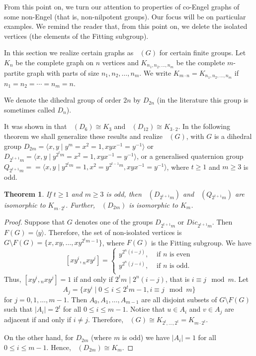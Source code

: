 \documentclass[reqno,12pt]{amsart}
\theoremstyle{plain}
\newtheorem{thm}{Theorem}[section]
\theoremstyle{definition}
\newcommand{\coeng}{\mathop{\mathcal{E}_c^-}}
\begin{document}
From this point on, we turn our attention to properties of co-Engel graphs of
some non-Engel (that is, non-nilpotent groups). Our focus will be on particular
examples.  We remind the reader that, from this point on, we delete the isolated vertices (the elements of the Fitting subgroup). 

In this section we realize certain graphs as $\coeng(G)$ for certain finite groups.
Let $K_n$ be the complete graph on $n$ vertices and  $K_{n_1, n_2, \dots, n_m}$ be the complete $m$-partite graph with parts of size $n_1, n_2, \dots, n_m$. We write $K_{m \cdot n} = K_{n_1, n_2, \dots, n_m}$  if $n_1 = n_2= \cdots = n_m = n$.

We denote the dihedral group of order $2n$ by $D_{2n} $ (in the literature this
group is sometimes called $D_n$).

It was shown in \cite{aa} that 
$\coeng(D_6)\cong K_3$ and $\coeng(D_{12})\cong K_{3\cdot2}$.
In the following theorem we shall generalize these results and realize 
$\coeng(G)$, with $G$ is a dihedral group
$D_{2m} = \langle x,y \mid y^m = x^2= 1,xyx^{-1} = y^{-1} \rangle$ or $D_{2^{t+1}m} = \langle x,y \mid y^{2^tm} = x^2= 1,xyx^{-1} = y^{-1}\rangle$, or a generalised quaternion group $Q_{2^{t+1}m} = = \langle x,y \mid y^{2^tm} = 1, x^2=y^{2^{t-1}m},xyx^{-1} = y^{-1}\rangle$,
where $t \geq 1$ and $m \geq 3$ is odd.

\begin{thm} \label{dihed} 
If $t \geq 1$ and $m \geq 3$ is odd, then $\coeng(D_{2^{t+1}m})$
and $\coeng(Q_{2^{t+1}m})$ are isomorphic  to $K_{m \cdot 2^t}$. Further, 
$\coeng(D_{2m})$  is isomorphic to $K_m$. 
\end{thm}
\begin{proof}
Suppose that $G$ denotes one of the groups $D_{2^{t+1}m}$ or $Dic_{2^{t+1}m}$. Then	
 $F(G) = \langle y\rangle$. Therefore, the set of non-isolated vertices is $G\setminus F(G)=\{x,xy,\dots,xy^{2^tm-1}\}$, where $F(G)$ is the Fitting subgroup. We have
\[ 
[xy^i, {}_nxy^j]= \begin{cases} 
      y^{2^n(i-j)}, & \textrm{ if $n$ is even} \\
      y^{2^n(j-i)}, & \textrm{ if $n$ is odd.} \\
   \end{cases} 
\]
Thus, $[xy^i, {}_nxy^j]= 1$ if and only if $2^tm\mid 2^n(i-j)$, that is $i \equiv j \mod m$. Let
$$
A_j=\{xy^i \mid 0\leq i\leq 2^tm-1, i \equiv j \mod m\}
$$
for $j=0, 1, \ldots,m-1$.
Then $A_0, A_1, \dots, A_{m-1}$ are all disjoint subsets of $G\setminus F(G)$ such that $|A_i| = 2^t$ for all $0 \leq i \leq m - 1$. Notice that $u\in A_i$ and $v\in A_j$ are adjacent if and only if $i\neq j$. Therefore, $\coeng(G)\cong K_{2^t, \dots, 2^t}=K_{m \cdot 2^t}$. 

On the other hand, for $D_{2m}$ (where $m$ is odd) we have $|A_i|=1$ for all $0 \leq i \leq m - 1$. Hence, $\coeng(D_{2m})\cong K_m$. 
\end{proof}
\end{document}
